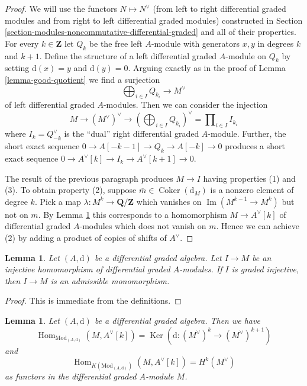 \documentclass{stacks-project}
\theoremstyle{plain}
\newtheorem{lemma}[subsection]{Lemma}
\theoremstyle{definition}
\theoremstyle{remark}
\numberwithin{equation}{subsection}
\def\Hom{\mathop{\mathrm{Hom}}\nolimits}
\def\Ker{\mathop{\mathrm{Ker}}}
\def\Im{\mathop{\mathrm{Im}}}
\def\Coker{\mathop{\mathrm{Coker}}}
\begin{document}
\begin{proof}
We will use the functors $N \mapsto N^\vee$ (from left to right
differential graded modules and from right to left differential
graded modules) constructed in
Section \ref{section-modules-noncommutative-differential-graded}
and all of their properties.
For every $k \in \mathbf{Z}$ let $Q_k$ be the free left $A$-module with
generators $x, y$ in degrees $k$ and $k + 1$. Define the structure of a
left differential graded $A$-module on $Q_k$ by setting $\text{d}(x) = y$
and $\text{d}(y) = 0$. Arguing exactly as in the proof of
Lemma \ref{lemma-good-quotient} we find a surjection
$$
\bigoplus\nolimits_{i \in I} Q_{k_i} \longrightarrow M^\vee
$$
of left differential graded $A$-modules. Then we can consider the injection
$$
M \to (M^\vee)^\vee \to (\bigoplus\nolimits_{i \in I} Q_{k_i})^\vee =
\prod\nolimits_{i \in I} I_{k_i}
$$
where $I_k = Q_{-k}^\vee$ is the ``dual'' right differential graded $A$-module.
Further, the short exact sequence $0 \to A[-k - 1] \to Q_k \to A[-k] \to 0$
produces a short exact sequence
$0 \to A^\vee[k] \to I_k \to A^\vee[k + 1] \to 0$.

\medskip\noindent
The result of the previous paragraph produces $M \to I$
having properties (1) and (3). To obtain property (2), suppose
$\overline{m} \in \Coker(\text{d}_M)$ is a nonzero element of
degree $k$. Pick a map $\lambda : M^k \to \mathbf{Q}/\mathbf{Z}$
which vanishes on $\Im(M^{k - 1} \to M^k)$ but not on $m$. By
Lemma \ref{lemma-hom-into-shift-dual-free}
this corresponds to a homomorphism $M \to A^\vee[k]$ of
differential graded $A$-modules which does not vanish on $m$.
Hence we can achieve (2) by adding
a product of copies of shifts of $A^\vee$.
\end{proof}

\begin{lemma}
\label{lemma-source-graded-injective}
Let $(A, \text{d})$ be a differential graded algebra.
Let $I \to M$ be an injective homomorphism of differential graded
$A$-modules. If $I$ is graded injective, then
$I \to M$ is an admissible monomorphism.
\end{lemma}

\begin{proof}
This is immediate from the definitions.
\end{proof}

\begin{lemma}
\label{lemma-hom-into-shift-dual-free}
Let $(A, \text{d})$ be a differential graded algebra. Then we have
$$
\Hom_{\text{Mod}_{(A, \text{d})}}(M, A^\vee[k]) =
\Ker(\text{d} : (M^\vee)^k \to (M^\vee)^{k + 1})
$$
and
$$
\Hom_{K(\text{Mod}_{(A, \text{d})})}(M, A^\vee[k]) = H^k(M^\vee)
$$
as functors in the differential graded $A$-module $M$.
\end{lemma}
\end{document}
